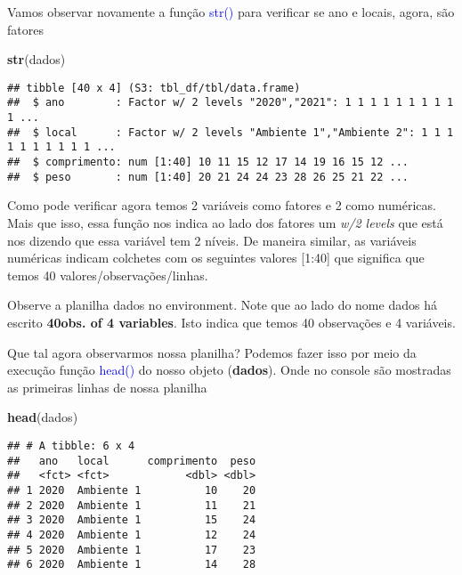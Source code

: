 \documentclass[14pt,titlepage, oneside, openany, a4paper]{book}
\newenvironment{Shaded}{\begin{snugshade}}{\end{snugshade}}
\newcommand{\KeywordTok}[1]{\textcolor[rgb]{0.13,0.29,0.53}{\textbf{#1}}}
\newcommand{\NormalTok}[1]{#1}
\begin{document}
Vamos observar novamente a função \textcolor{blue}{str()} para verificar se ano e locais, agora, são fatores

\begin{Shaded}
\begin{Highlighting}[]
\KeywordTok{str}\NormalTok{(dados)}
\end{Highlighting}
\end{Shaded}

\begin{verbatim}
## tibble [40 x 4] (S3: tbl_df/tbl/data.frame)
##  $ ano        : Factor w/ 2 levels "2020","2021": 1 1 1 1 1 1 1 1 1 1 ...
##  $ local      : Factor w/ 2 levels "Ambiente 1","Ambiente 2": 1 1 1 1 1 1 1 1 1 1 ...
##  $ comprimento: num [1:40] 10 11 15 12 17 14 19 16 15 12 ...
##  $ peso       : num [1:40] 20 21 24 24 23 28 26 25 21 22 ...
\end{verbatim}

Como pode verificar agora temos 2 variáveis como fatores e 2 como numéricas. Mais que isso, essa função nos indica ao lado dos fatores um \emph{w/2 levels} que está nos dizendo que essa variável tem 2 níveis. De maneira similar, as variáveis numéricas indicam colchetes com os seguintes valores {[}1:40{]} que significa que temos 40 valores/observações/linhas.

Observe a planilha dados no environment. Note que ao lado do nome dados há escrito \textbf{40obs. of 4 variables}. Isto indica que temos 40 observações e 4 variáveis.

Que tal agora observarmos nossa planilha? Podemos fazer isso por meio da execução função \textcolor{blue}{head()} do nosso objeto (\textbf{dados}). Onde no console são mostradas as primeiras linhas de nossa planilha

\begin{Shaded}
\begin{Highlighting}[]
\KeywordTok{head}\NormalTok{(dados)}
\end{Highlighting}
\end{Shaded}

\begin{verbatim}
## # A tibble: 6 x 4
##   ano   local      comprimento  peso
##   <fct> <fct>            <dbl> <dbl>
## 1 2020  Ambiente 1          10    20
## 2 2020  Ambiente 1          11    21
## 3 2020  Ambiente 1          15    24
## 4 2020  Ambiente 1          12    24
## 5 2020  Ambiente 1          17    23
## 6 2020  Ambiente 1          14    28
\end{verbatim}
\end{document}
